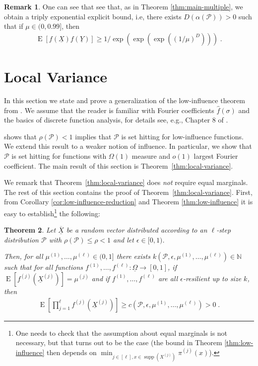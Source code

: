 \documentclass{daj}
\newcommand{\1}{\mathbbm{1}}
\theoremstyle{plain}
\newtheorem{theorem}{Theorem}[section]
\theoremstyle{definition}
\newtheorem{remark}[theorem]{Remark}
\DeclareMathOperator*{\EE}{E}
\DeclareMathOperator*{\supp}{supp}
\newcommand{\cP}{\mathcal{P}}
\begin{document}
\begin{remark}
One can see that see that, as in Theorem \ref{thm:main-multiple}, we obtain
a triply exponential explicit bound, i.e, there exists 
$D(\alpha(\cP)) > 0$ such that if $\mu \in (0, 0.99]$, then
\begin{align*}
\EE\left[ f(\underline{X})f(\underline{Y}) \right]
  \ge 1/\exp\left(\exp\left(\exp\left( \left(1/\mu\right)^D\right) \right)\right)\;.
\end{align*}
\end{remark}

\section{Local Variance}
\label{sec:local-variance}

In this section we state and prove a generalization of the low-influence theorem 
from \cite{Mos10}. We assume that the reader is familiar with
Fourier coefficients $\hat{f}(\sigma)$ and the basics of discrete function 
analysis, for details see, e.g., Chapter 8 of \cite{Dol14}. 

\cite{Mos10} shows that $\rho(\cP) < 1$ implies that $\cP$ is set hitting
for low-influence functions. We extend this result to
a weaker notion of influence. In particular, we show that $\cP$ is set hitting
for functions with $\Omega(1)$ measure and $o(1)$ largest Fourier coefficient.
The main result of this section is Theorem~\ref{thm:local-variance}.

We remark that Theorem~\ref{thm:local-variance} 
does \emph{not} require equal marginals.
The rest of this section contains the proof of Theorem~\ref{thm:local-variance}.
First, from Corollary \ref{cor:low-influence-reduction} and
Theorem \ref{thm:low-influence} it is easy to establish\footnote{
One needs to check that the assumption about equal marginals is not necessary,
but that turns out to be the case (the bound in Theorem \ref{thm:low-influence}
then depends on $\min_{j \in [\ell], x \in \supp(X^{(j)})} \pi^{(j)}(x)$).
} the following:
\begin{theorem}\label{thm:stabilityExpectation}
Let $\overline{\underline{X}}$ be a random vector distributed according to
an $\ell$-step distribution $\cP$ with $\rho(\cP) \le \rho < 1$ and
let $\epsilon \in [0, 1)$.

Then, for
all $\mu^{(1)}, \ldots, \mu^{(\ell)} \in (0, 1]$ there exists
$k(\cP, \epsilon, \mu^{(1)}, \ldots, \mu^{(\ell)}) \in \mathbb{N}$ 
such that for all functions
$f^{(1)}, \ldots, f^{(\ell)}: \underline{\Omega} \to [0, 1]$,
if $\EE[f^{(j)}(\underline{X}^{(j)})] = \mu^{(j)}$ and
if $f^{(1)}, \ldots, f^{(\ell)}$ are all $\epsilon$-resilient up to size
$k$, then
\begin{align}
\EE\left[\prod_{j=1}^{\ell} f^{(j)}(\underline{X}^{(j)}) \right]
\geq c(\cP, \epsilon, \mu^{(1)}, \ldots, \mu^{(\ell)}) > 0 \; .
\end{align}
\end{theorem}
\end{document}
